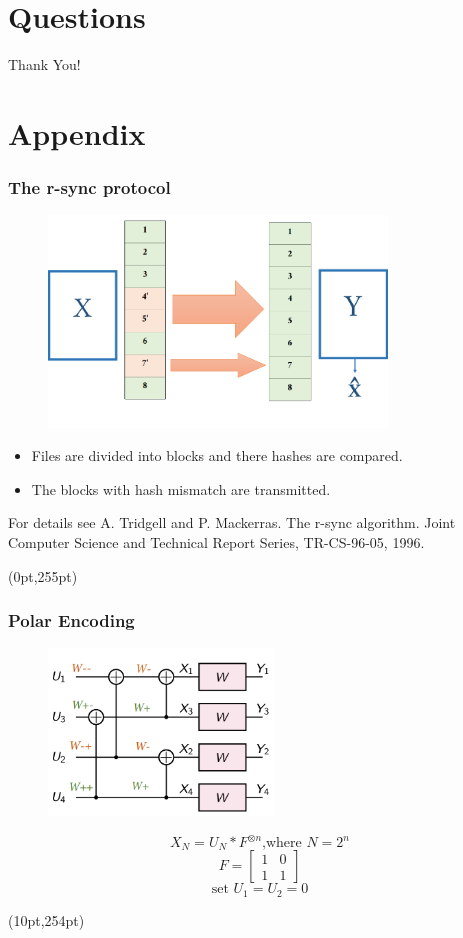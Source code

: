 \documentclass[xcolor=dvipsnames]{beamer}
\newcommand\hypercorner[1]{%
  \begin{textblock*}{\paperwidth}(0pt,255pt)
    \raggedleft #1\hspace{.5em}
  \end{textblock*}}
\newcommand\hyperback[1]{%
  \begin{textblock*}{\paperwidth}(10pt,254pt)
    \raggedright #1\hspace{.5em}
  \end{textblock*}}
\begin{document}
\section{Questions}
\begin{frame}
\centering
\Huge Thank You!
\end{frame}

\appendix
\section{Appendix}
\begin{frame}[label = rsync]
\frametitle{The r-sync protocol }
\begin{figure}
\centering
\includegraphics[width=9cm]{./rsync.png}
\end{figure}
\begin{itemize}
\item Files are divided into blocks and there hashes are compared.
\item The blocks with hash mismatch are transmitted.
\end{itemize}
\tiny For details see A. Tridgell and P. Mackerras. The r-sync algorithm. Joint Computer Science and
Technical Report Series, TR-CS-96-05, 1996.
\hypercorner{\hyperlink{rsynccomp}{}}
\end{frame}
\begin{frame}[label = polarencode]
\frametitle{Polar Encoding}
\begin{figure}
\centering
\includegraphics[width=6cm]{./arikanflyp4.png}
\end{figure}
$$X_N=U_N*F^{\otimes n}\text{,where } N=2^n$$ 
\[
F=
  \begin{bmatrix}
    1 & 0 \\
    1 & 1
  \end{bmatrix}
\]
$$\text{set }U_1=U_2=0$$
\hyperback{\hyperlink{polarencodedecode}{}}
\end{frame}
\end{document}
